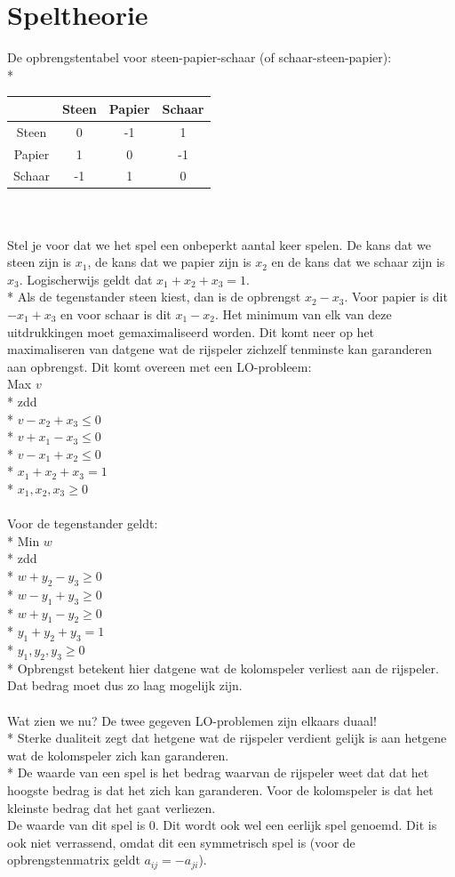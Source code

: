 \documentclass[10pt]{article}
\begin{document}
\section{Speltheorie}
De opbrengstentabel voor steen-papier-schaar (of schaar-steen-papier):\\*
\begin{tabular}{| c | c | c | c |}
\hline
 & Steen & Papier & Schaar \\ \hline
Steen & 0 & -1 & 1 \\ \hline
Papier & 1 & 0 & -1 \\ \hline
Schaar & -1 & 1 & 0 \\ \hline
\end{tabular}\\\\
Stel je voor dat we het spel een onbeperkt aantal keer spelen. De kans dat we steen zijn is $x_1$, de kans dat we papier zijn is $x_2$ en de kans dat we schaar zijn is $x_3$. Logischerwijs geldt dat $x_1 + x_2 + x_3 = 1$.\\*
Als de tegenstander steen kiest, dan is de opbrengst $x_2 - x_3$. Voor papier is dit $-x_1 + x_3$ en voor schaar is dit $x_1 - x_2$. Het minimum van elk van deze uitdrukkingen moet gemaximaliseerd worden. Dit komt neer op het maximaliseren van datgene wat de rijspeler zichzelf tenminste kan garanderen aan opbrengst. Dit komt overeen met een LO-probleem:\\
Max $v$\\*
zdd\\*
$v - x_2 + x_3 \le 0$\\*
$v + x_1 - x_3 \le 0$\\*
$v - x_1 + x_2 \le 0$\\*
$x_1 + x_2 + x_3 = 1$\\*
$x_1, x_2, x_3 \ge 0$\\\\
Voor de tegenstander geldt:\\*
Min $w$\\*
zdd\\*
$w + y_2 - y_3 \ge 0$\\*
$w - y_1 + y_3 \ge 0$\\*
$w + y_1 - y_2 \ge 0$\\*
$y_1 + y_2 + y_3 = 1$\\*
$y_1, y_2, y_3 \ge 0$\\*
Opbrengst betekent hier datgene wat de kolomspeler verliest aan de rijspeler. Dat bedrag moet dus zo laag mogelijk zijn.\\\\
Wat zien we nu? De twee gegeven LO-problemen zijn elkaars duaal!\\*
Sterke dualiteit zegt dat hetgene wat de rijspeler verdient gelijk is aan hetgene wat de kolomspeler zich kan garanderen.\\*
De waarde van een spel is het bedrag waarvan de rijspeler weet dat dat het hoogste bedrag is dat het zich kan garanderen. Voor de kolomspeler is dat het kleinste bedrag dat het gaat verliezen.\\
De waarde van dit spel is 0. Dit wordt ook wel een eerlijk spel genoemd. Dit is ook niet verrassend, omdat dit een symmetrisch spel is (voor de opbrengstenmatrix geldt $a_{ij} = -a_{ji}$).
\end{document}

